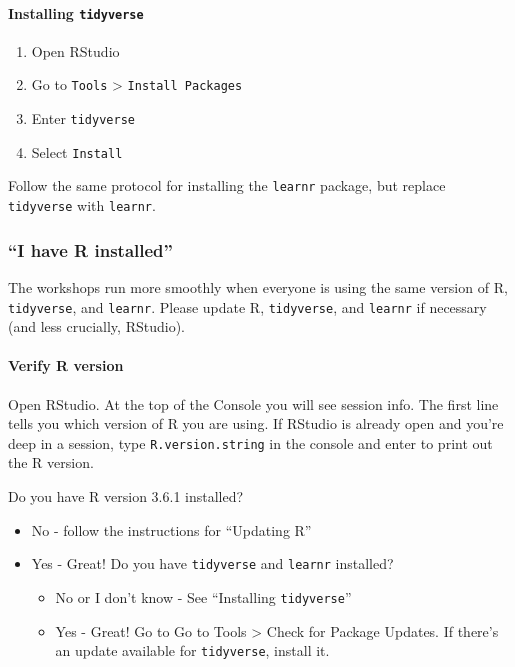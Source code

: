 \documentclass[]{article}
\providecommand{\tightlist}{%
  \setlength{\itemsep}{0pt}\setlength{\parskip}{0pt}}
\let\oldparagraph\paragraph
\renewcommand{\paragraph}[1]{\oldparagraph{#1}\mbox{}}
\begin{document}
\hypertarget{installing-tidyverse}{%
\paragraph{\texorpdfstring{Installing
\texttt{tidyverse}}{Installing tidyverse}}\label{installing-tidyverse}}

\begin{enumerate}
\def\labelenumi{\arabic{enumi}.}
\tightlist
\item
  Open RStudio
\item
  Go to \texttt{Tools} \textgreater{} \texttt{Install\ Packages}
\item
  Enter \texttt{tidyverse}
\item
  Select \texttt{Install}
\end{enumerate}

Follow the same protocol for installing the \texttt{learnr} package, but
replace \texttt{tidyverse} with \texttt{learnr}.

\hypertarget{i-have-r-installed}{%
\subsubsection{``I have R installed''}\label{i-have-r-installed}}

The workshops run more smoothly when everyone is using the same version
of R, \texttt{tidyverse}, and \texttt{learnr}. Please update R,
\texttt{tidyverse}, and \texttt{learnr} if necessary (and less
crucially, RStudio).

\hypertarget{verify-r-version}{%
\paragraph{Verify R version}\label{verify-r-version}}

Open RStudio. At the top of the Console you will see session info. The
first line tells you which version of R you are using. If RStudio is
already open and you're deep in a session, type
\texttt{R.version.string} in the console and enter to print out the R
version.

Do you have R version 3.6.1 installed?

\begin{itemize}
\tightlist
\item
  No - follow the instructions for ``Updating R''
\item
  Yes - Great! Do you have \texttt{tidyverse} and \texttt{learnr}
  installed?

  \begin{itemize}
  \tightlist
  \item
    No or I don't know - See ``Installing \texttt{tidyverse}''
  \item
    Yes - Great! Go to Go to Tools \textgreater{} Check for Package
    Updates. If there's an update available for \texttt{tidyverse},
    install it.
  \end{itemize}
\end{itemize}
\end{document}
